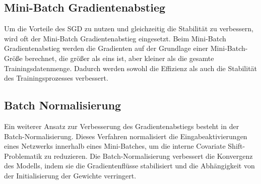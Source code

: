 \subsection{Mini-Batch Gradientenabstieg}

    Um die Vorteile des SGD zu nutzen und gleichzeitig die Stabilität zu verbessern, wird oft der Mini-Batch Gradientenabstieg eingesetzt. 
    Beim Mini-Batch Gradientenabstieg werden die Gradienten auf der Grundlage einer Mini-Batch-Größe berechnet, die größer als eins ist, aber kleiner als die gesamte Trainingsdatenmenge. 
    Dadurch werden sowohl die Effizienz als auch die Stabilität des Trainingsprozesses verbessert.

\subsection{Batch Normalisierung}

    Ein weiterer Ansatz zur Verbesserung des Gradientenabstiegs besteht in der Batch-Normalisierung. 
    Dieses Verfahren normalisiert die Eingabeaktivierungen eines Netzwerks innerhalb eines Mini-Batches, um die interne Covariate Shift-Problematik zu reduzieren. 
    Die Batch-Normalisierung verbessert die Konvergenz des Modells, indem sie die Gradientenflüsse stabilisiert und die Abhängigkeit von der Initialisierung der Gewichte verringert.
